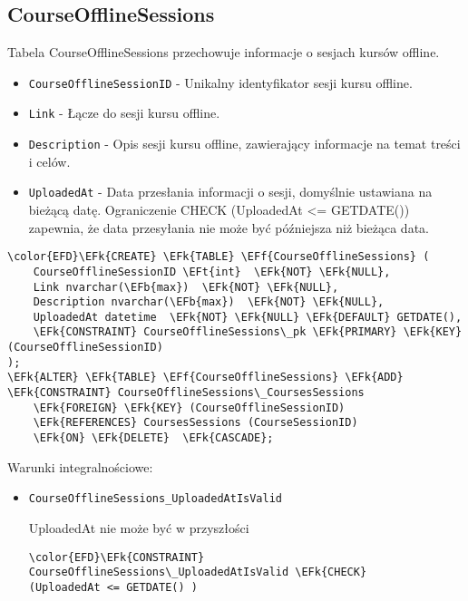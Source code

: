 \documentclass[11pt]{article}
\newcommand{\EFk}[1]{\textcolor{EFk}{\textbf{#1}}} %
\newcommand{\EFb}[1]{\textcolor{EFb}{\textbf{#1}}} %
\newcommand{\EFf}[1]{\textcolor{EFf}{#1}} %
\newcommand{\EFt}[1]{\textcolor{EFt}{\textbf{#1}}} %
\begin{document}
\subsection{CourseOfflineSessions}
\label{sec:org545ef01}
Tabela CourseOfflineSessions przechowuje informacje o sesjach kursów offline.
\begin{itemize}
\item \texttt{CourseOfflineSessionID} - Unikalny identyfikator sesji kursu offline.
\item \texttt{Link} - Łącze do sesji kursu offline.
\item \texttt{Description} - Opis sesji kursu offline, zawierający informacje na temat treści i celów.
\item \texttt{UploadedAt} - Data przesłania informacji o sesji, domyślnie ustawiana na bieżącą datę. Ograniczenie CHECK (UploadedAt <= GETDATE()) zapewnia, że data przesyłania nie może być późniejsza niż bieżąca data.
\end{itemize}
\begin{Code}
\begin{Verbatim}
\color{EFD}\EFk{CREATE} \EFk{TABLE} \EFf{CourseOfflineSessions} (
    CourseOfflineSessionID \EFt{int}  \EFk{NOT} \EFk{NULL},
    Link nvarchar(\EFb{max})  \EFk{NOT} \EFk{NULL},
    Description nvarchar(\EFb{max})  \EFk{NOT} \EFk{NULL},
    UploadedAt datetime  \EFk{NOT} \EFk{NULL} \EFk{DEFAULT} GETDATE(),
    \EFk{CONSTRAINT} CourseOfflineSessions\_pk \EFk{PRIMARY} \EFk{KEY}  (CourseOfflineSessionID)
);
\EFk{ALTER} \EFk{TABLE} \EFf{CourseOfflineSessions} \EFk{ADD} \EFk{CONSTRAINT} CourseOfflineSessions\_CoursesSessions
    \EFk{FOREIGN} \EFk{KEY} (CourseOfflineSessionID)
    \EFk{REFERENCES} CoursesSessions (CourseSessionID)
    \EFk{ON} \EFk{DELETE}  \EFk{CASCADE};
\end{Verbatim}
\end{Code}
Warunki integralnościowe:


\begin{itemize}
\item \texttt{CourseOfflineSessions\_UploadedAtIsValid}

UploadedAt nie może być w przyszłości
\begin{Code}
\begin{Verbatim}
\color{EFD}\EFk{CONSTRAINT} CourseOfflineSessions\_UploadedAtIsValid \EFk{CHECK}
(UploadedAt <= GETDATE() )
\end{Verbatim}
\end{Code}
\end{itemize}
\end{document}
